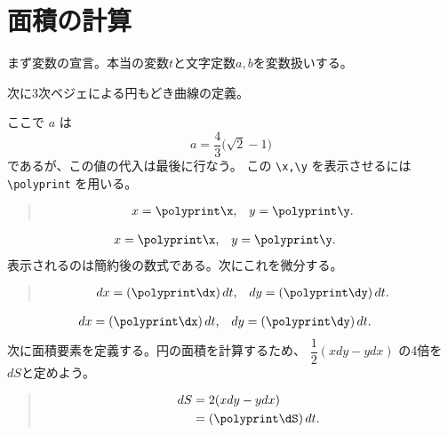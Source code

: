 \documentclass[dvipdfmx]{jsarticle}
\begin{document}
\section{面積の計算}
まず変数の宣言。本当の変数$t$と文字定数$a,b$を変数扱いする。
\begin{quote}
\begin{boxedverbatim}
\end{boxedverbatim}
\end{quote}
次に3次ベジェによる円もどき曲線の定義。
\polydefine{}
\polydefine{}
\begin{quote}
\begin{boxedverbatim}
\polydefine{}
\polydefine{}
\end{boxedverbatim}
\end{quote}
ここで $a$ は
\[
  a=\dfrac43\bigl(\sqrt2-1\bigr)
\]
であるが、この値の代入は最後に行なう。
この \verb+\x,\y+ を表示させるには \verb+\polyprint+ を用いる。
\begin{quote}
\begin{boxedverbatim}
\begin{align*}
  x &= \polyprint\x, & y &= \polyprint\y.
\end{align*}    
\end{boxedverbatim}
\end{quote}
\begin{align*}
  x &= \polyprint\x, & y &= \polyprint\y.
\end{align*}
表示されるのは簡約後の数式である。次にこれを微分する。
\polydiff{}\x  \polydiff{}\y
\begin{quote}
\begin{boxedverbatim}
\polydiff{}\x  \polydiff{}\y
\begin{align*}
  dx &= (\polyprint\dx)\,dt, & dy &= (\polyprint\dy)\,dt.
\end{align*}    
\end{boxedverbatim}
\end{quote}
\begin{align*}
  dx &= (\polyprint\dx)\,dt, & dy &= (\polyprint\dy)\,dt.
\end{align*}    
次に面積要素を定義する。円の面積を計算するため、
$\dfrac12(xdy-ydx)$ の4倍を$dS$と定めよう。
\begin{quote}
\begin{boxedverbatim}
\polymul\dSA\x\dy  \polymul\dSB\y\dx
\polysub\dS\dSA\dSB \polymul{}\dS
\begin{align*}
 dS &=2(xdy-ydx)\\
    &=(\polyprint\dS)\,dt.
\end{align*}
\end{boxedverbatim}
\end{quote}
\end{document}

